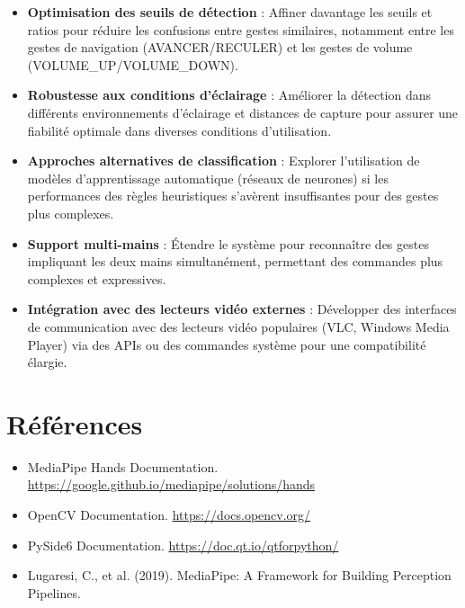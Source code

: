 \documentclass[12pt,a4paper]{article}
\begin{document}
\begin{itemize}
    \item \textbf{Optimisation des seuils de détection} : Affiner davantage les seuils et ratios pour réduire les confusions entre gestes similaires, notamment entre les gestes de navigation (AVANCER/RECULER) et les gestes de volume (VOLUME\_UP/VOLUME\_DOWN).
    
    \item \textbf{Robustesse aux conditions d'éclairage} : Améliorer la détection dans différents environnements d'éclairage et distances de capture pour assurer une fiabilité optimale dans diverses conditions d'utilisation.
    
    \item \textbf{Approches alternatives de classification} : Explorer l'utilisation de modèles d'apprentissage automatique (réseaux de neurones) si les performances des règles heuristiques s'avèrent insuffisantes pour des gestes plus complexes.
    
    \item \textbf{Support multi-mains} : Étendre le système pour reconnaître des gestes impliquant les deux mains simultanément, permettant des commandes plus complexes et expressives.
    
    \item \textbf{Intégration avec des lecteurs vidéo externes} : Développer des interfaces de communication avec des lecteurs vidéo populaires (VLC, Windows Media Player) via des APIs ou des commandes système pour une compatibilité élargie.
\end{itemize}

\newpage

\section*{Références}

\begin{itemize}
    \item MediaPipe Hands Documentation. \url{https://google.github.io/mediapipe/solutions/hands}
    \item OpenCV Documentation. \url{https://docs.opencv.org/}
    \item PySide6 Documentation. \url{https://doc.qt.io/qtforpython/}
    \item Lugaresi, C., et al. (2019). MediaPipe: A Framework for Building Perception Pipelines.
\end{itemize}
\end{document}
